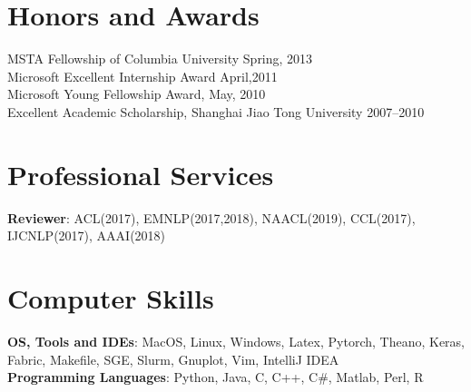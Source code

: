 \documentclass[margin,line]{res}
\begin{document}
\begin{resume}
\section{\sc Honors and Awards}
MSTA Fellowship of Columbia University \hfill{Spring, 2013}\\
Microsoft Excellent Internship Award \hfill{April,2011}\\
Microsoft Young Fellowship Award, \hfill{May, 2010}\\
Excellent Academic Scholarship, Shanghai Jiao Tong University \hfill{2007--2010}\\

\section{\sc Professional Services}
{\bf Reviewer}: ACL(2017), EMNLP(2017,2018), NAACL(2019), CCL(2017), IJCNLP(2017), AAAI(2018)
\section{\sc Computer Skills} 
{\bf OS, Tools and IDEs}: MacOS, Linux, Windows, Latex, Pytorch, Theano, Keras, Fabric, Makefile, SGE, Slurm, Gnuplot, Vim, IntelliJ IDEA\\
{\bf Programming Languages}: Python, Java, C, C++, C\#, Matlab, Perl, R
\end{resume}
\end{document}
